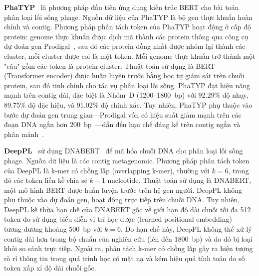 \textbf{PhaTYP}~\cite{shang2023phatyp} là phương pháp đầu tiên ứng dụng kiến trúc BERT cho bài toán phân loại lối sống phage. Nguồn dữ liệu của PhaTYP là bộ gen thực khuẩn hoàn chỉnh và contig. Phương pháp phân tách token của PhaTYP hoạt động ở cấp độ protein: genome thực khuẩn được dịch mã thành các protein thông qua công cụ dự đoán gen Prodigal~\cite{hyatt2010prodigal}, sau đó các protein đồng nhất được nhóm lại thành các cluster, mỗi cluster được coi là một token. Mỗi genome thực khuẩn trở thành một "câu" gồm các token là protein cluster. Thuật toán sử dụng là BERT (Transformer encoder) được huấn luyện trước bằng học tự giám sát trên chuỗi protein, sau đó tinh chỉnh cho tác vụ phân loại lối sống. PhaTYP đạt hiệu năng mạnh trên contig dài, đặc biệt là Nhóm~D (1200--1800~bp) với 92.29\% độ nhạy, 89.75\% độ đặc hiệu, và 91.02\% độ chính xác. Tuy nhiên, PhaTYP phụ thuộc vào bước dự đoán gen trung gian---Prodigal vốn có hiệu suất giảm mạnh trên các đoạn DNA ngắn hơn 200~bp~\cite{trimble2012short}---dẫn đến hạn chế đáng kể trên contig ngắn và phân mảnh~\cite{shang2023phatyp}.

\textbf{DeepPL}~\cite{zhang2024deeppl} sử dụng DNABERT~\cite{ji2021dnabert} để mã hóa chuỗi DNA cho phân loại lối sống phage. Nguồn dữ liệu là các contig metagenomic. Phương pháp phân tách token của DeepPL là k-mer có chồng lấp (overlapping k-mer), thường với $k=6$, trong đó các token liền kề chia sẻ $k-1$ nucleotide. Thuật toán sử dụng là DNABERT, một mô hình BERT được huấn luyện trước trên hệ gen người. DeepPL không phụ thuộc vào dự đoán gen, hoạt động trực tiếp trên chuỗi DNA. Tuy nhiên, DeepPL kế thừa hạn chế của DNABERT gốc về giới hạn độ dài chuỗi tối đa 512 token do sử dụng biểu diễn vị trí học được (learned positional embedding)~\cite{ji2021dnabert}---tương đương khoảng 500~bp với $k=6$. Do hạn chế này, DeepPL không thể xử lý contig dài hơn trong bộ chuẩn của nghiên cứu (lên đến 1800~bp) và do đó bị loại khỏi so sánh trực tiếp. Ngoài ra, phân tách k-mer có chồng lấp gây ra hiện tượng rò rỉ thông tin trong quá trình học có mặt nạ và kém hiệu quả tính toán do số token xấp xỉ độ dài chuỗi gốc.

